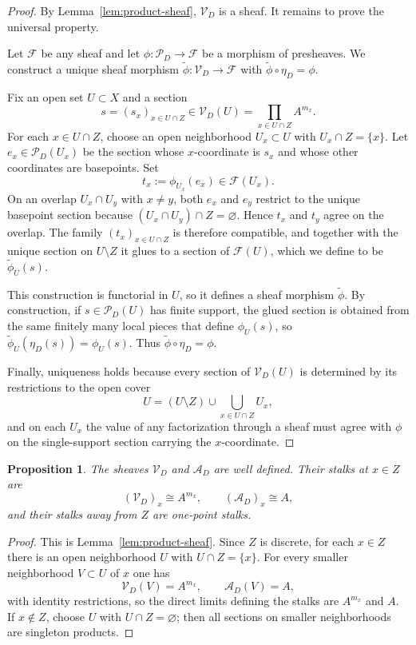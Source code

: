 \documentclass[11pt,a4paper]{article}
\numberwithin{equation}{section}
\newtheorem{proposition}[theorem]{Proposition}
\theoremstyle{definition}
\theoremstyle{remark}
\newcommand{\cP}{\mathcal P}
\newcommand{\cV}{\mathcal V}
\newcommand{\cA}{\mathcal A}
\begin{document}
\begin{proof}
By Lemma~\ref{lem:product-sheaf}, $\cV_D$ is a sheaf.  It remains to prove the universal property.

Let $\mathcal F$ be any sheaf and let $\phi:\cP_D\to\mathcal F$ be a morphism of presheaves.  We construct a unique sheaf morphism $\widetilde\phi:\cV_D\to\mathcal F$ with $\widetilde\phi\circ\eta_D=\phi$.

Fix an open set $U\subset X$ and a section
\[
s=(s_x)_{x\in U\cap Z}\in\cV_D(U)=\prod_{x\in U\cap Z}A^{m_x}.
\]
For each $x\in U\cap Z$, choose an open neighborhood $U_x\subset U$ with $U_x\cap Z=\{x\}$.  Let $e_x\in\cP_D(U_x)$ be the section whose $x$-coordinate is $s_x$ and whose other coordinates are basepoints.  Set
\[
t_x:=\phi_{U_x}(e_x)\in\mathcal F(U_x).
\]
On an overlap $U_x\cap U_y$ with $x\neq y$, both $e_x$ and $e_y$ restrict to the unique basepoint section because $(U_x\cap U_y)\cap Z=\varnothing$.  Hence $t_x$ and $t_y$ agree on the overlap.  The family $(t_x)_{x\in U\cap Z}$ is therefore compatible, and together with the unique section on $U\setminus Z$ it glues to a section of $\mathcal F(U)$, which we define to be $\widetilde\phi_U(s)$.

This construction is functorial in $U$, so it defines a sheaf morphism $\widetilde\phi$.  By construction, if $s\in\cP_D(U)$ has finite support, the glued section is obtained from the same finitely many local pieces that define $\phi_U(s)$, so $\widetilde\phi_U(\eta_D(s))=\phi_U(s)$.  Thus $\widetilde\phi\circ\eta_D=\phi$.

Finally, uniqueness holds because every section of $\cV_D(U)$ is determined by its restrictions to the open cover
\[
U=(U\setminus Z)\cup\bigcup_{x\in U\cap Z}U_x,
\]
and on each $U_x$ the value of any factorization through a sheaf must agree with $\phi$ on the single-support section carrying the $x$-coordinate.
\end{proof}

\begin{proposition}\label{prop:shadow-stalks}
The sheaves $\cV_D$ and $\cA_D$ are well defined.  Their stalks at $x\in Z$ are
\[
(\cV_D)_x\cong A^{m_x},\qquad (\cA_D)_x\cong A,
\]
and their stalks away from $Z$ are one-point stalks.
\end{proposition}

\begin{proof}
This is Lemma~\ref{lem:product-sheaf}.  Since $Z$ is discrete, for each $x\in Z$ there is an open neighborhood $U$ with $U\cap Z=\{x\}$.  For every smaller neighborhood $V\subset U$ of $x$ one has
\[
\cV_D(V)=A^{m_x},\qquad \cA_D(V)=A,
\]
with identity restrictions, so the direct limits defining the stalks are $A^{m_x}$ and $A$.  If $x\notin Z$, choose $U$ with $U\cap Z=\varnothing$; then all sections on smaller neighborhoods are singleton products.
\end{proof}
\end{document}

